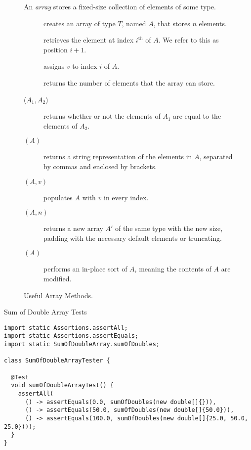 \begin{figure}[tp]
  \small
  \begin{tcolorbox}[title=Java Arrays]
    An \textit{array} stores a fixed-size collection of elements of some type.
    \vspace{2ex}
  \begin{description}
    \item [] creates an array of type $T$, named $A$, that stores $n$ elements.
    \item [] retrieves the element at index $i^{\text{th}}$ of $A$. We refer to this as position $i + 1$.
    \item [] assigns $v$ to index $i$ of $A$.
    \item [] returns the number of elements that the array can store.
    \item [($A_1, A_2$)] returns whether or not the elements of $A_1$ are equal to the elements of $A_2$.
    \item [$(A)$] returns a string representation of the elements in $A$, separated by commas and enclosed by brackets.
    \item [$(A, v)$] populates $A$ with $v$ in every index.
    \item [$(A, n)$] returns a new array $A'$ of the same type with the new size, padding with the necessary default elements or truncating.
    \item [$(A)$] performs an in-place sort of $A$, meaning the contents of $A$ are modified.
  \end{description}
\end{tcolorbox}
  \caption{Useful Array Methods.}
  \label{fig:arrays}
\end{figure}


\begin{cl}{Sum of Double Array Tests}
\begin{lstlisting}[language=MyJava]
import static Assertions.assertAll;
import static Assertions.assertEquals;
import static SumOfDoubleArray.sumOfDoubles;

class SumOfDoubleArrayTester {

  @Test
  void sumOfDoubleArrayTest() {
    assertAll(
      () -> assertEquals(0.0, sumOfDoubles(new double[]{})),
      () -> assertEquals(50.0, sumOfDoubles(new double[]{50.0})),
      () -> assertEquals(100.0, sumOfDoubles(new double[]{25.0, 50.0, 25.0})));
  }
}
\end{lstlisting}
\end{cl}

